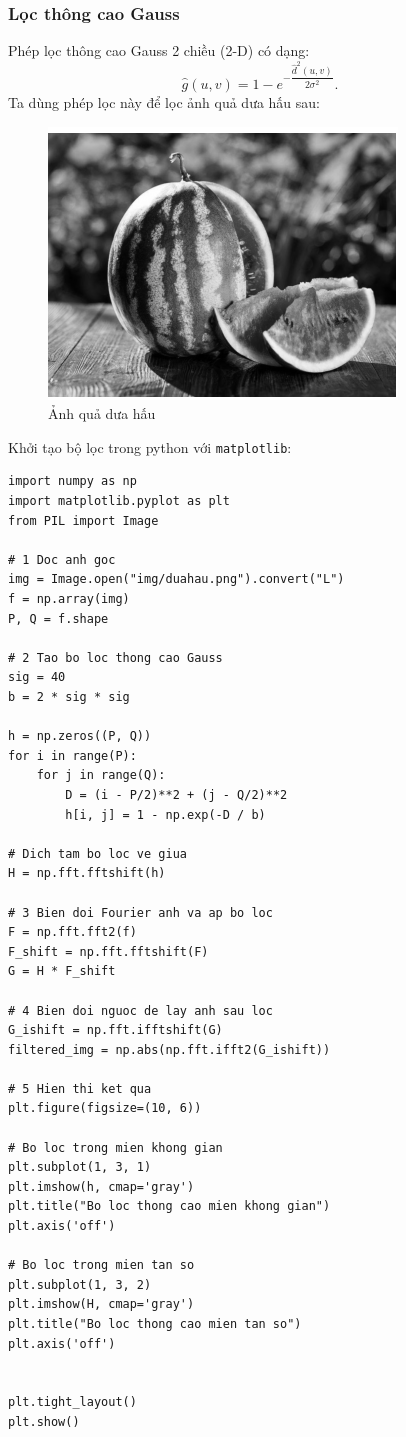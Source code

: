 \documentclass[12pt,a4paper]{report}
\numberwithin{equation}{section}
\theoremstyle{definition} %
\begin{document}
\subsubsection{Lọc thông cao Gauss}
Phép lọc thông cao Gauss 2 chiều (2-D) có dạng: 
\begin{equation}
    \hat{g}(u,v) = 1- e^{-\dfrac{\hat{d}^2(u,v)}{2\sigma^2}}.    
\end{equation}
Ta dùng phép lọc này để lọc ảnh quả dưa hấu sau: 
\begin{figure}[H]
\centering
\includegraphics[width=0.5\linewidth]{img/Duahau.png}
\caption{Ảnh quả dưa hấu}
\label{fig132}
\end{figure}
Khởi tạo bộ lọc trong python với \texttt{matplotlib}: 
\begin{lstlisting}
import numpy as np
import matplotlib.pyplot as plt
from PIL import Image

# 1 Doc anh goc
img = Image.open("img/duahau.png").convert("L")
f = np.array(img)
P, Q = f.shape

# 2 Tao bo loc thong cao Gauss
sig = 40
b = 2 * sig * sig

h = np.zeros((P, Q))
for i in range(P):
    for j in range(Q):
        D = (i - P/2)**2 + (j - Q/2)**2
        h[i, j] = 1 - np.exp(-D / b)

# Dich tam bo loc ve giua
H = np.fft.fftshift(h)

# 3 Bien doi Fourier anh va ap bo loc
F = np.fft.fft2(f)
F_shift = np.fft.fftshift(F)
G = H * F_shift

# 4 Bien doi nguoc de lay anh sau loc
G_ishift = np.fft.ifftshift(G)
filtered_img = np.abs(np.fft.ifft2(G_ishift))

# 5 Hien thi ket qua
plt.figure(figsize=(10, 6))

# Bo loc trong mien khong gian
plt.subplot(1, 3, 1)
plt.imshow(h, cmap='gray')
plt.title("Bo loc thong cao mien khong gian")
plt.axis('off')

# Bo loc trong mien tan so
plt.subplot(1, 3, 2)
plt.imshow(H, cmap='gray')
plt.title("Bo loc thong cao mien tan so")
plt.axis('off')


plt.tight_layout()
plt.show()
\end{lstlisting}
\end{document}
